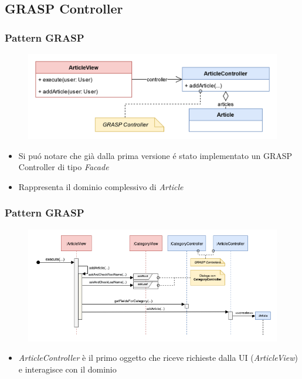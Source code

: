 \subsection{GRASP Controller}
\beamertitle

\begin{frame}
    \frametitle{Pattern GRASP}
    \begin{figure}
        \includegraphics[width=1\textwidth]{img/MV.png}
    \end{figure}
    \begin{itemize}
        \item Si puó notare che già dalla prima versione é stato implementato un GRASP Controller di tipo \emph{Facade}
        \item Rappresenta il dominio complessivo di \emph{Article}
    \end{itemize}
\end{frame}

\begin{frame}
    \frametitle{Pattern GRASP}
    \begin{figure}
        \includegraphics[width=1\textwidth]{img/sequenzaGraspController.png}
    \end{figure}
    \begin{itemize}
        \item \emph{ArticleController} è il primo oggetto che riceve richieste dalla UI (\emph{ArticleView}) e interagisce con il dominio
    \end{itemize}
\end{frame}




